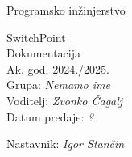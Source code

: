 \documentclass[12pt]{report}
\begin{document}
	\begin{titlepage}
		\begin{center}
				\Large Programsko inžinjerstvo\\
				
				
				
				\Huge SwitchPoint\\
				\Large Dokumentacija\\
				\large Ak. god. 2024./2025.\\
				
				\normalsize
				Grupa: \textit{Nemamo ime}\\
				Voditelj: \textit{Zvonko Čagalj}\\
				
				
				Datum predaje: \textit{?}\\
				
				
				Nastavnik: \textit{Igor Stančin}\\
				
				
							
		\end{center}
	\end{titlepage}
	
	\tableofcontents
	
	
	
	
	\begingroup
	

	\listoffigures

	\endgroup

	
	
	
	\eject 
	
	
	
\end{document}
